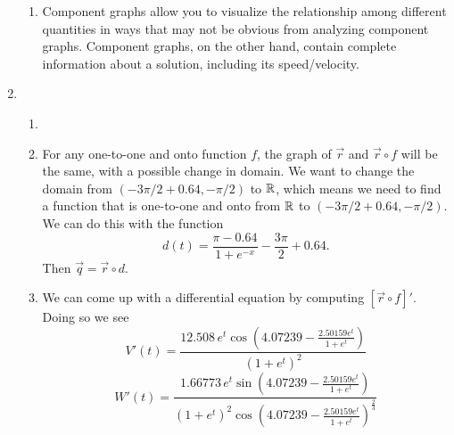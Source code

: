 \begin{enumerate}
\begin{enumerate}
				\item Component graphs allow you to visualize the relationship among different quantities in ways
				that may not be obvious from analyzing component graphs. Component graphs, on the other hand, contain
				complete information about a solution, including its speed/velocity.
			\end{enumerate}

			\item
			\begin{enumerate}
				\item \phantom{x}

				\begin{center}
				~~~~~~~
				\end{center}
				\item For any one-to-one and onto function $f$, the graph of $\vec r$ and $\vec r\circ f$ will be the same,
				with a possible change in domain. We want to change the domain from $(-3\pi/2+0.64, -\pi/2)$ to $\mathbb{R}$, which
				means we need to find a function that is one-to-one and onto from $\mathbb{R}$ to $(-3\pi/2+0.64, -\pi/2)$. 
				We can do this with the function
				\[
					d(t) = \frac{\pi-0.64}{1+e^{-x}}-\frac{3\pi}{2}+0.64.
				\]
				Then $\vec q=\vec r\circ d$.
				\item We can come up with a differential equation by computing $[\vec r\circ f]'$. Doing so we see
				\[
					V'(t) = \frac{12.508\, e^t \cos\left(4.07239 - \frac{2.50159 e^t}{1 + e^t}\right)}{(1 + e^t)^2}
				\]
				\[
				W'(t) = 
				\frac{1.66773\, e^t \sin\left(4.07239 - \frac{2.50159 e^t}{1 + e^t}\right)}{(1 + e^t)^2 \cos\left(4.07239 - \frac{2.50159 e^t}{1 + e^t}\right)^{\frac{2}{3}}}
				\]


\end{enumerate}
\end{enumerate}
